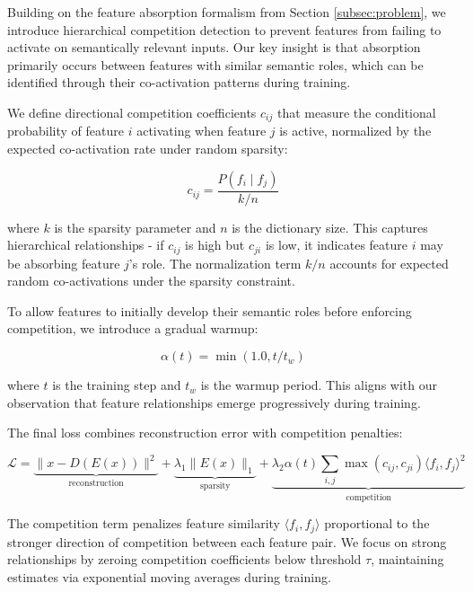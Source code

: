 \documentclass{article} %
\begin{document}
Building on the feature absorption formalism from Section \ref{subsec:problem}, we introduce hierarchical competition detection to prevent features from failing to activate on semantically relevant inputs. Our key insight is that absorption primarily occurs between features with similar semantic roles, which can be identified through their co-activation patterns during training.

We define directional competition coefficients $c_{ij}$ that measure the conditional probability of feature $i$ activating when feature $j$ is active, normalized by the expected co-activation rate under random sparsity:

\begin{equation}
    c_{ij} = \frac{P(f_i \mid f_j)}{k/n}
\end{equation}

where $k$ is the sparsity parameter and $n$ is the dictionary size. This captures hierarchical relationships - if $c_{ij}$ is high but $c_{ji}$ is low, it indicates feature $i$ may be absorbing feature $j$'s role. The normalization term $k/n$ accounts for expected random co-activations under the sparsity constraint.

To allow features to initially develop their semantic roles before enforcing competition, we introduce a gradual warmup:

\begin{equation}
    \alpha(t) = \min(1.0, t/t_w)
\end{equation}

where $t$ is the training step and $t_w$ is the warmup period. This aligns with our observation that feature relationships emerge progressively during training.

The final loss combines reconstruction error with competition penalties:

\begin{equation}
    \mathcal{L} = \underbrace{\|x - D(E(x))\|^2}_{\text{reconstruction}} + \underbrace{\lambda_1 \|E(x)\|_1}_{\text{sparsity}} + \underbrace{\lambda_2 \alpha(t) \sum_{i,j} \max(c_{ij}, c_{ji}) \langle f_i, f_j \rangle^2}_{\text{competition}}
\end{equation}

The competition term penalizes feature similarity $\langle f_i, f_j \rangle$ proportional to the stronger direction of competition between each feature pair. We focus on strong relationships by zeroing competition coefficients below threshold $\tau$, maintaining estimates via exponential moving averages during training.
\end{document}
